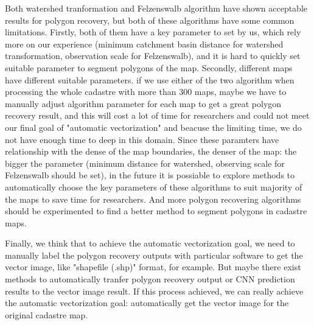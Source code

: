 \documentclass[12pt]{article}
\begin{document}
Both watershed tranformation and Felzenswalb algorithm have shown acceptable results for polygon recovery, but both of these algorithms have some common limitations. Firstly, both of them have a key parameter to set by us, which rely more on our experience (minimum catchment basin distance for watershed transformation, observation scale for Felzenswalb), and it is hard to quickly set suitable parameter to segment polygons of the map. Secondly, different maps have different suitable parameters. if we use either of the two algorithm when processing the whole cadastre with more than 300 maps, maybe we have to manually adjust algorithm parameter for each map to get a great polygon recovery result, and this will cost a lot of time for researchers and could not meet our final goal of "automatic vectorization" and beacuse the limiting time, we do not have enough time to deep in this domain. Since these paramters have relationship with the dense of the map boundaries, the denser of the map: the bigger the parameter (minimum distance for watershed, observing scale for Felzenswalb should be set), in the future it is possiable to explore methods to automatically choose the key parameters of these algorithms to suit majority of the maps to save time for researchers. And more polygon recovering algorithms should be experimented to find a better method to segment polygons in cadastre maps.

Finally, we think that to achieve the automatic vectorization goal, we need to manually label the polygon recovery outputs with particular software to get the vector image, like "shapefile (.shp)" format, for example. But maybe there exist methods to automatically tranfer polygon recovery output or CNN prediction results to the vector image result. If this process achieved, we can really achieve the automatic vectorization goal: automatically get the vector image for the original cadastre map.


\newpage








\clearpage

\end{document}
